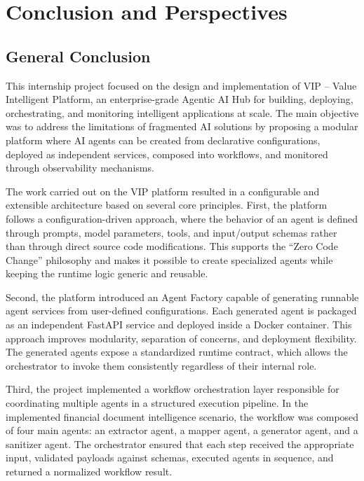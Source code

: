 
\clearpage

\section{Conclusion and Perspectives}

\subsection{General Conclusion}
This internship project focused on the design and implementation of VIP -- Value Intelligent Platform, an enterprise-grade Agentic AI Hub for building, deploying, orchestrating, and monitoring intelligent applications at scale. The main objective was to address the limitations of fragmented AI solutions by proposing a modular platform where AI agents can be created from declarative configurations, deployed as independent services, composed into workflows, and monitored through observability mechanisms.

The work carried out on the VIP platform resulted in a configurable and extensible architecture based on several core principles. First, the platform follows a configuration-driven approach, where the behavior of an agent is defined through prompts, model parameters, tools, and input/output schemas rather than through direct source code modifications. This supports the ``Zero Code Change'' philosophy and makes it possible to create specialized agents while keeping the runtime logic generic and reusable.

Second, the platform introduced an Agent Factory capable of generating runnable agent services from user-defined configurations. Each generated agent is packaged as an independent FastAPI service and deployed inside a Docker container. This approach improves modularity, separation of concerns, and deployment flexibility. The generated agents expose a standardized runtime contract, which allows the orchestrator to invoke them consistently regardless of their internal role.

Third, the project implemented a workflow orchestration layer responsible for coordinating multiple agents in a structured execution pipeline. In the implemented financial document intelligence scenario, the workflow was composed of four main agents: an extractor agent, a mapper agent, a generator agent, and a sanitizer agent. The orchestrator ensured that each step received the appropriate input, validated payloads against schemas, executed agents in sequence, and returned a normalized workflow result.

